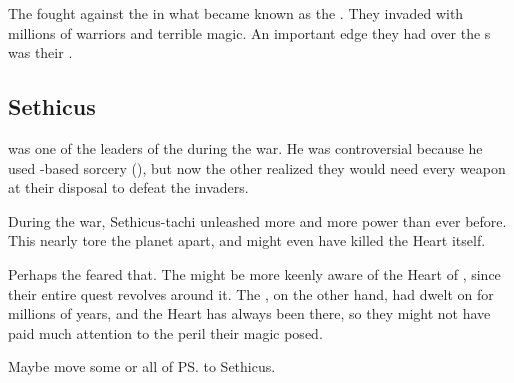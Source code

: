 The \banes{} fought against the \ophidians{} in what became known as the \firstbanewar. 
They invaded with millions of \bane{} warriors and terrible magic. 
An important edge they had over the \Miithian{}s was their .









\subsection{Sethicus}
 was one of the leaders of the \ophidians{} during the war. 
He was controversial because he used \xs{}-based sorcery (), but now the other \ophidians{} realized they would need every weapon at their disposal to defeat the \bane{} invaders. 

During the war, Sethicus-tachi unleashed more \daemons{} and more \xzaishannic{} power than ever before. This nearly tore the planet apart, and might even have killed the Heart itself. 

Perhaps the \banes{} feared that. The \banes{} might be more keenly aware of the Heart of \Miith{}, since their entire quest revolves around it. The \ophidians, on the other hand, had dwelt on \Miith{} for millions of years, and the Heart has always been there, so they might not have paid much attention to the peril their magic posed. 


Maybe move some or all of \ps{\Kserasshana}  to Sethicus. 









